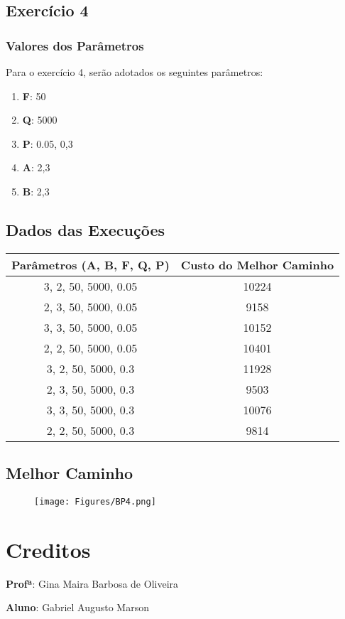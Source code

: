 \documentclass[hidelinks,12pt]{article}
\begin{document}
\subsection{Exercício 4}

	\subsubsection{Valores dos Parâmetros}	
	Para o exercício 4, serão adotados os seguintes parâmetros:
	
	\begin{enumerate}
		\item \textbf{F}: 50
		\item \textbf{Q}: 5000
		\item \textbf{P}: 0.05, 0,3
		\item \textbf{A}:  2,3
		\item \textbf{B}:  2,3	
	\end{enumerate}
	\newpage
	\subsection{Dados das Execuções}
	\begin{table}[!h]
		\centering
		\label{my-label}
			\begin{tabular}{|c|c|}
			\hline
			\multicolumn{1}{|c|}{Parâmetros (A, B, F, Q, P)} & \multicolumn{1}{|c|}{Custo do Melhor Caminho} \\ \hline
			3, 2, 50, 5000, 0.05                              &            10224                                  \\ \hline
			2, 3, 50, 5000, 0.05                             &              9158                                \\ \hline
			3, 3, 50, 5000, 0.05                              &            10152                                  \\ \hline
			2, 2, 50, 5000, 0.05                             &              10401                                \\ \hline
			3, 2, 50, 5000, 0.3                              &               11928                               \\ \hline
			2, 3, 50, 5000, 0.3                             &               9503                               \\ \hline
			3, 3, 50, 5000, 0.3                              &               10076                               \\ \hline
			2, 2, 50, 5000, 0.3                             &              9814                                \\ \hline
			\end{tabular}
	\end{table}

	\subsection{Melhor Caminho}
	
			\begin{figure}[!h]
				\centering
				\texttt{[image: Figures/BP4.png]}
			\end{figure}
	
	\section{Creditos}
	
		\textbf{Profª}: Gina Maira Barbosa de Oliveira
		
		\textbf{Aluno}: Gabriel Augusto Marson 
	
\end{document}
